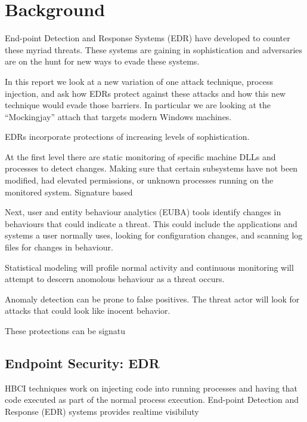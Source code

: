 



\section{Background}


End-point Detection and Response Systems (EDR) have developed to counter these myriad threats.  These systems are gaining in sophistication and adversaries
are on the hunt for new ways to evade these systems.

In this report we look at a new variation of one attack technique, process injection, and ask how EDRs protect against these attacks and how
this new technique would evade those barriers.  In particular we are looking at the ``Mockingjay'' attach that targets modern Windows machines.

EDRs incorporate protections of increasing levels of sophistication.

At the first level there are static monitoring of specific machine DLLs and processes to detect changes.  Making sure that certain subsystems
have not been modified, had elevated permissions, or unknown processes running on the monitored system.  Signature based

Next, user and entity behaviour analytics (EUBA) tools identify changes in behaviours that could indicate a threat.  This could include the
applications and systems a user normally uses, looking for configuration changes, and scanning log files for changes in behaviour.

Statistical modeling will profile normal activity and continuous monitoring will attempt to descern anomolous behaviour as a threat occurs.

Anomaly detection can be prone to false positives.  The threat actor will look for attacks that could look like inocent behavior.

These protections can be signatu



\subsection{Endpoint Security: EDR}

HBCI techniques work on injecting code into running processes and having that code executed as part of the normal process
execution.  End-point Detection and Response (EDR) systems \autocite{Hayes:2023} provides realtime visibiluty

